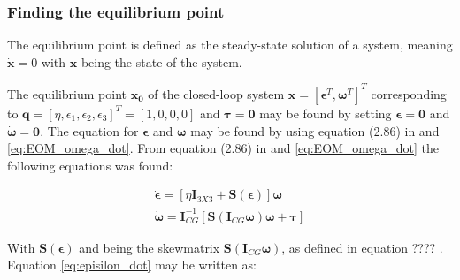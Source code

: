 \subsubsection*{Finding the equilibrium point}

The equilibrium point is defined as the steady-state solution of a system, meaning $\dot{\mathbf{x}} = 0$ with $\mathbf{x}$ being the state of the system.


The equilibrium point $\mathbf{x_0}$ of the closed-loop system $\mathbf{x} = [ \boldsymbol{\epsilon}^T, \boldsymbol{\omega}^T]^T$ corresponding to $\mathbf{q} = [\eta,\epsilon_1, \epsilon_2, \epsilon_3]^T = [1, 0, 0, 0]$ and $\boldsymbol{\tau} = \boldsymbol{0}$ may be found by setting $\dot{\boldsymbol{\epsilon}} = \mathbf{0}$ and $\dot{\boldsymbol{\omega}} = \mathbf{0}$. The equation for $\boldsymbol{\epsilon}$ and $\boldsymbol{\omega}$ may be found by using equation (2.86) in \cite{Fossen2011} and \eqref{eq:EOM_omega_dot}. From equation (2.86) in \cite{Fossen2011} and \eqref{eq:EOM_omega_dot} the following equations was found:


\begin{subequations}
\label{eq:x_dot}
	\begin{align}
		\dot{\boldsymbol{\epsilon}} =  [ \eta \mathbf{I}_{3X3} + \mathbf{S}(\boldsymbol{\epsilon}) ] \boldsymbol{\omega}  \label{eq:episilon_dot} \\
		 \dot{\boldsymbol{\omega}} = \mathbf{I}_{CG}^{-1} [\mathbf{S} (\mathbf{I}_{CG} \boldsymbol{\omega} ) \boldsymbol{\omega} +  \boldsymbol{\tau} ] \label{eq:omega_dot}
	\end{align}	
\end{subequations}


With $\mathbf{S} (\boldsymbol{\epsilon})$ and being the skewmatrix $\mathbf{S} (\mathbf{I}_{CG} \boldsymbol{\omega} ) $, as defined in \cite{Fossen2011} equation ????  . Equation \eqref{eq:episilon_dot} may be written as:

